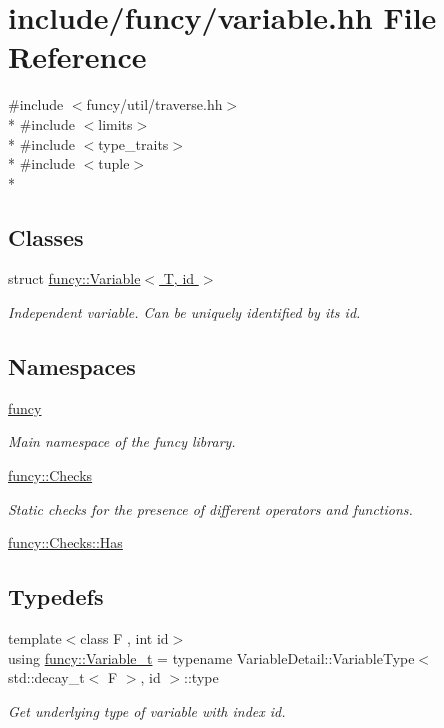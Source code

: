 \hypertarget{variable_8hh}{\section{include/funcy/variable.hh File Reference}
\label{variable_8hh}
}
{\ttfamily \#include $<$funcy/util/traverse.\-hh$>$}\\*
{\ttfamily \#include $<$limits$>$}\\*
{\ttfamily \#include $<$type\-\_\-traits$>$}\\*
{\ttfamily \#include $<$tuple$>$}\\*
\subsection*{Classes}
\begin{DoxyCompactItemize}
\item 
struct \hyperlink{structfuncy_1_1Variable}{funcy\-::\-Variable$<$ T, id $>$}
\begin{DoxyCompactList}\small\item\em Independent variable. Can be uniquely identified by its id. \end{DoxyCompactList}\end{DoxyCompactItemize}
\subsection*{Namespaces}
\begin{DoxyCompactItemize}
\item 
\hyperlink{namespacefuncy}{funcy}
\begin{DoxyCompactList}\small\item\em Main namespace of the funcy library. \end{DoxyCompactList}\item 
\hyperlink{namespacefuncy_1_1Checks}{funcy\-::\-Checks}
\begin{DoxyCompactList}\small\item\em Static checks for the presence of different operators and functions. \end{DoxyCompactList}\item 
\hyperlink{namespacefuncy_1_1Checks_1_1Has}{funcy\-::\-Checks\-::\-Has}
\end{DoxyCompactItemize}
\subsection*{Typedefs}
\begin{DoxyCompactItemize}
\item 
{\footnotesize template$<$class F , int id$>$ }\\using \hyperlink{namespacefuncy_abb94be57bfb973aa11e5be3f37f7f608}{funcy\-::\-Variable\-\_\-t} = typename Variable\-Detail\-::\-Variable\-Type$<$ std\-::decay\-\_\-t$<$ F $>$, id $>$\-::type
\begin{DoxyCompactList}\small\item\em Get underlying type of variable with index id. \end{DoxyCompactList}\end{DoxyCompactItemize}
